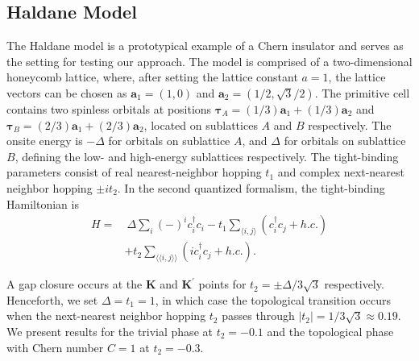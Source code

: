 \documentclass[galley,aps,pra,10pt,amsmath,amssymb,
    superscriptaddress,nofootinbib,longbibliography]{revtex4-2}
\begin{document}
\subsection{Haldane Model}


The Haldane model is a prototypical example of a Chern insulator and serves as the setting for testing our approach. The model is comprised of a two-dimensional honeycomb lattice, where, after setting the lattice constant $a=1$, the lattice vectors can be chosen as $\mathbf{a}_1 = (1, 0)$ and $\mathbf{a}_2 = (1/2, \sqrt{3}/2)$. The primitive cell contains two spinless orbitals at positions $\mathbf{\tau}_A = (1/3) \mathbf{a}_1 + (1/3) \mathbf{a}_2$ and $\mathbf{\tau}_B = (2/3) \mathbf{a}_1 + (2/3) \mathbf{a}_2$, located on sublattices $A$ and $B$ respectively. The onsite energy is $-\Delta$ for orbitals on sublattice $A$, and $\Delta$ for orbitals on sublattice $B$, defining the low- and high-energy sublattices respectively. The tight-binding parameters consist of real nearest-neighbor hopping $t_1$ and complex next-nearest neighbor hopping $\pm it_2$. In the second quantized formalism, the tight-binding Hamiltonian is
\begin{equation}
    \begin{split}
     H = &\ \Delta \sum_i (-)^{i} c_i^{\dagger} c_i -t_1 \sum_{\langle i, j \rangle} (c_i^{\dagger}c_j + h.c.) \\ &+ t_2 \sum_{\langle\langle i, j \rangle\rangle} (i c_i^{\dagger}c_j +h.c. ) .
    \end{split}
\end{equation}

A gap closure occurs at the $\mathbf{K}$ and $\mathbf{K}^\prime$ points for $t_2 = \pm \Delta / 3\sqrt{3}$ respectively. Henceforth, we set $\Delta = t_1 = 1$, in which case the topological transition occurs when the next-nearest neighbor hopping $t_2$ passes through $|t_2|=1/3\sqrt{3}\approx 0.19$. We present results for the trivial phase at $t_2=-0.1$ and the topological phase with Chern number $C=1$ at $t_2=-0.3$.
\end{document}
